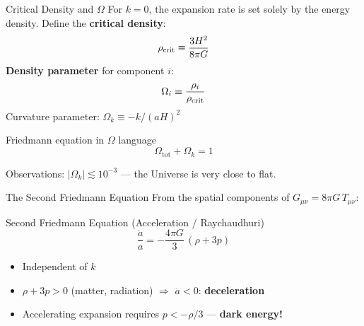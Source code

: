 \documentclass[aspectratio=169,11pt]{beamer}
\newcommand{\Omk}{\Omega_{k}}
\newcommand{\Omtot}{\Omega_{\mathrm{tot}}}
\begin{document}
\begin{frame}{Critical Density and $\Omega$}
For $k=0$, the expansion rate is set solely by the energy density. Define the \textbf{critical density}:
\begin{equation*}
    \rho_{\rm crit} \equiv \frac{3H^2}{8\pi G}
\end{equation*}
\textbf{Density parameter} for component $i$:
\begin{equation*}
    \Omega_i \equiv \frac{\rho_i}{\rho_{\rm crit}}
\end{equation*}
Curvature parameter: $\Omk\equiv -k/(aH)^2$

\vspace{0.3cm}
\begin{block}{Friedmann equation in $\Omega$ language}
\begin{equation*}
    \Omtot + \Omk = 1
\end{equation*}
\end{block}
Observations: $|\Omk|\lesssim 10^{-3}$ --- the Universe is very close to flat.
\end{frame}

\begin{frame}{The Second Friedmann Equation}
From the spatial components of $G_{\mu\nu}=8\pi G\,T_{\mu\nu}$:

\begin{alertblock}{Second Friedmann Equation (Acceleration / Raychaudhuri)}
\begin{equation*}
    \frac{\ddot{a}}{a} = -\frac{4\pi G}{3}\,(\rho+3p)
\end{equation*}
\end{alertblock}

\begin{itemize}
    \item Independent of $k$
    \item $\rho+3p>0$ (matter, radiation) $\Rightarrow$ $\ddot{a}<0$: \textbf{deceleration}
    \item Accelerating expansion requires $p<-\rho/3$ --- \textbf{dark energy!}
\end{itemize}
\end{frame}
\end{document}
